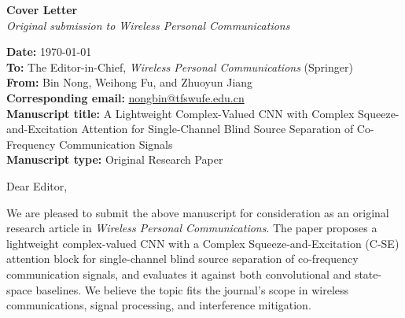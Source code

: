 \documentclass[11pt,a4paper]{article}
\begin{document}
\begin{center}
{\Large\bfseries Cover Letter}\\[4pt]
{\itshape Original submission to \emph{Wireless Personal Communications}}
\end{center}

\vspace{1em}

\noindent\textbf{Date:} \today\\[2pt]
\textbf{To:} The Editor-in-Chief, \emph{Wireless Personal Communications} (Springer)\\
\textbf{From:} Bin Nong, Weihong Fu, and Zhuoyun Jiang\\
\textbf{Corresponding email:} \href{mailto:nongbin@tfswufe.edu.cn}{nongbin@tfswufe.edu.cn}\\
\textbf{Manuscript title:} A Lightweight Complex-Valued CNN with Complex Squeeze-and-Excitation Attention for Single-Channel Blind Source Separation of Co-Frequency Communication Signals\\
\textbf{Manuscript type:} Original Research Paper

\vspace{1em}

\noindent Dear Editor,

\vspace{0.4em}

We are pleased to submit the above manuscript for consideration as an original research article in \emph{Wireless Personal Communications}. The paper proposes a lightweight complex-valued CNN with a Complex Squeeze-and-Excitation (C-SE) attention block for single-channel blind source separation of co-frequency communication signals, and evaluates it against both convolutional and state-space baselines. We believe the topic fits the journal's scope in wireless communications, signal processing, and interference mitigation.
\end{document}
